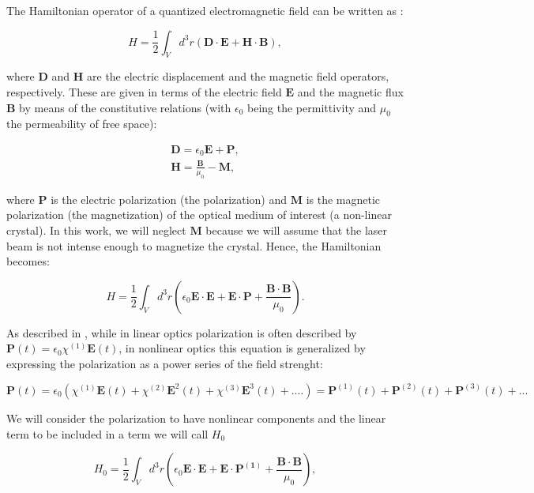 \documentclass[12pt]{book}
\begin{document}
The Hamiltonian operator of a quantized electromagnetic field can be written as \cite{jackson}:

\begin{equation}
H=\frac{1}{2}\int_{V} d^{3}r (\mathbf{D \cdot E}+\mathbf{H \cdot B}),
\end{equation}

where $\textbf{D}$ and $\textbf{H}$ are the electric displacement and the magnetic field operators, respectively. These are given in terms of the electric field $\textbf{E}$ and the magnetic flux $\textbf{B}$ by means of the constitutive relations (with $\epsilon_{0} $ being the permittivity and $\mu_{0}$ the permeability of free space):


\begin{align}
\textbf{D}= \epsilon_{0} \textbf{E}+\textbf{P},\\
\textbf{H}=\frac{\textbf{B}}{\mu_{0}}-\textbf{M},
\end{align}

where $\mathbf{P}$ is the electric polarization (the polarization) and $\mathbf{M}$ is the magnetic polarization (the magnetization) of the optical medium of interest (a non-linear crystal). In this work, we will neglect $\textbf{M}$ because we will assume that the laser beam is not intense enough to magnetize the crystal. Hence, the Hamiltonian becomes:

\begin{equation}
H=\frac{1}{2}\int_{V} d^{3}r \left(\epsilon_{0}\mathbf{E \cdot E}+\mathbf{E \cdot P}+\frac{\mathbf{B \cdot B}}{\mu_{0}} \right).
\end{equation}


As described in \cite{boyd}, while in linear optics polarization is often described by $\mathbf{P}(t)=\epsilon_{0} \chi^{(1)}\mathbf{E}(t)$, in nonlinear optics this equation is generalized by expressing the polarization as a power series of the field strenght:

\begin{equation}
\mathbf{P}(t)=\epsilon_{0} \left( \chi^{(1)}\mathbf{E}(t)+\chi^{(2)}\mathbf{E}^{2}(t)+\chi^{(3)}\mathbf{E}^{3}(t)+.... \right)=\mathbf{P}^{(1)}(t)+\mathbf{P}^{(2)}(t)+\mathbf{P}^{(3)}(t)+...
\end{equation}

 We will consider the polarization to have nonlinear components and the linear term to be included in a term we will call $H_{0}$
 
\begin{equation}
 H_{0}=\frac{1}{2}\int_{V} d^{3}r \left(\epsilon_{0}\mathbf{E \cdot E}+\mathbf{E} \cdot \mathbf{P^{(1)}}+\frac{\mathbf{B \cdot B}}{\mu_{0}} \right),
\end{equation}
\end{document}
